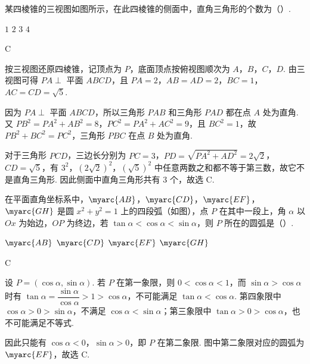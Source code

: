 \begin{problem}
某四棱锥的三视图如图所示，在此四棱锥的侧面中，直角三角形的个数为（\quad）.


\choices
    {\(1\)}
    {\(2\)}
    {\(3\)}
    {\(4\)}
\end{problem}

\begin{answer}
C
\end{answer}

\begin{solution}
按三视图还原四棱锥，记顶点为 \(P\)，底面顶点按俯视图顺次为 \(A\)，\(B\)，\(C\)，\(D\). 由三视图可得 \(PA\perp\) 平面 \(ABCD\)，且 \(PA=2\)，\(AB=AD=2\)，\(BC=1\)，\(AC=CD=\sqrt5\).

因为 \(PA\perp\) 平面 \(ABCD\)，所以三角形 \(PAB\) 和三角形 \(PAD\) 都在点 \(A\) 处为直角. 又 \(PB^2=PA^2+AB^2=8\)，\(PC^2=PA^2+AC^2=9\)，且 \(BC^2=1\)，故 \(PB^2+BC^2=PC^2\)，三角形 \(PBC\) 在点 \(B\) 处为直角.

对于三角形 \(PCD\)，三边长分别为 \(PC=3\)，\(PD=\sqrt{PA^2+AD^2}=2\sqrt2\)，\(CD=\sqrt5\)，有 \(3^2\)，\((2\sqrt2)^2\)，\((\sqrt5)^2\) 中任意两数之和都不等于第三数，故它不是直角三角形. 因此侧面中直角三角形共有 \(3\) 个，故选 C.
\end{solution}


\begin{problem}
在平面直角坐标系中，\(\myarc{AB}\)，\(\myarc{CD}\)，\(\myarc{EF}\)，\(\myarc{GH}\) 是圆 \(x^2+y^2=1\) 上的四段弧（如图），点 \(P\) 在其中一段上，角 \(\alpha\) 以 \(Ox\) 为始边，\(OP\) 为终边，若 \(\tan\alpha<\cos\alpha<\sin\alpha\)，则 \(P\) 所在的圆弧是（\quad）.


\choices
    {\(\myarc{AB}\)}
    {\(\myarc{CD}\)}
    {\(\myarc{EF}\)}
    {\(\myarc{GH}\)}
\end{problem}

\begin{answer}
C
\end{answer}

\begin{solution}
设 \(P=(\cos\alpha,\sin\alpha)\). 若 \(P\) 在第一象限，则 \(0<\cos\alpha<1\)，而 \(\sin\alpha>\cos\alpha\) 时有 \(\tan\alpha=\dfrac{\sin\alpha}{\cos\alpha}>1>\cos\alpha\)，不可能满足 \(\tan\alpha<\cos\alpha\). 第四象限中 \(\cos\alpha>0>\sin\alpha\)，不满足 \(\cos\alpha<\sin\alpha\)；第三象限中 \(\tan\alpha>0>\cos\alpha\)，也不可能满足不等式.

因此只能有 \(\cos\alpha<0\)，\(\sin\alpha>0\)，即 \(P\) 在第二象限. 图中第二象限对应的圆弧为 \(\myarc{EF}\)，故选 C.
\end{solution}


